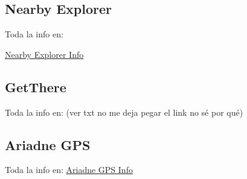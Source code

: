 \documentclass{article}
\begin{document}
	\subsection{Nearby Explorer}
	Toda la info en:
	
	\textcolor{blue}{\href{iOS accesibility: 	https://developer.apple.com/accessibility/ios}{Nearby Explorer Info}}
	
	
	\subsection{GetThere}
	Toda la info en: (ver txt no me deja pegar el link no sé por qué)
	 
	
	\subsection{Ariadne GPS}
	Toda la info en:
	\textcolor{blue}{\href{http://www.ariadnegps.eu/}{Ariadne GPS Info}}
 
	
\end{document}
